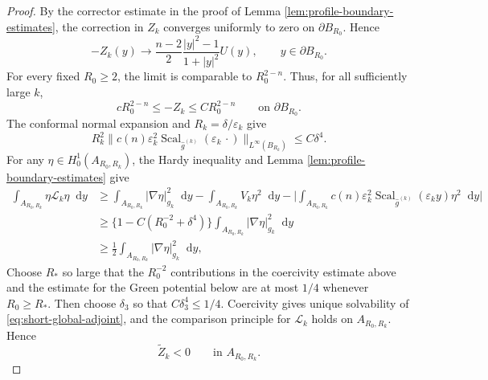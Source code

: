 \documentclass[11pt]{article}
\numberwithin{equation}{section}
\theoremstyle{remark}
\newcommand{\dd}{\mathop{}\!\mathrm{d}}
\begin{document}
\begin{proof}
 By the corrector estimate in the proof of
Lemma  \ref{lem:profile-boundary-estimates}, the correction in $Z_k$
converges uniformly to zero on $\partial B_{R_0}$.  Hence
{
\[
 -Z_k(y)\to
 \frac{n-2}{2}\frac{|y|^2-1}{1+|y|^2}U(y),
 \qquad y\in\partial B_{R_0}.
\]
}
 For every fixed $R_0\ge2$, the limit is comparable to $R_0^{2-n}$.
Thus, for all sufficiently large $k$,
{
\[
 cR_0^{2-n}\le -Z_k\le CR_0^{2-n}
 \qquad\text{on }\partial B_{R_0}.
\]
}
 The conformal normal expansion and $R_k=\delta/\varepsilon_k$ give
{
\[
 R_k^2\Big\|c(n)\varepsilon_k^2
 \operatorname{Scal}_{\widehat g^{(k)}}(\varepsilon_k\,\cdot)
 \Big\|_{L^\infty(B_{R_k})}
 \le C\delta^4.
\]
}
For any $\eta\in H_0^1(A_{R_0,R_k})$, the Hardy inequality and
Lemma  \ref{lem:profile-boundary-estimates} give
{
\[
\begin{aligned}
 \int_{A_{R_0,R_k}}\eta\mathcal L_k\eta\dd y
 &\ge \int_{A_{R_0,R_k}}|\nabla\eta|_{g_k}^2\dd y
 -\int_{A_{R_0,R_k}}V_k\eta^2\dd y
 -\Big|\int_{A_{R_0,R_k}}c(n)\varepsilon_k^2
 \operatorname{Scal}_{\widehat g^{(k)}}(\varepsilon_k y)
 \eta^2\dd y\Big|\\
 &\ge\bigl\{1-C(R_0^{-2}+\delta^4)\bigr\}
 \int_{A_{R_0,R_k}}|\nabla\eta|_{g_k}^2\dd y\\
 &\ge\frac12\int_{A_{R_0,R_k}}|\nabla\eta|_{g_k}^2\dd y,
\end{aligned}
\]
}
Choose $R_*$ so large that the $R_0^{-2}$ contributions
in the coercivity estimate above and the estimate for the Green potential below are at
most $1/4$ whenever $R_0\ge R_*$.  Then choose $\delta_3$ so that
$C\delta_3^4\le1/4$.
{Coercivity gives unique solvability of
\eqref{eq:short-global-adjoint}, and the comparison principle for
\(\mathcal L_k\) holds on \(A_{R_0,R_k}\).}  Hence
{
\[
 \widetilde Z_k<0\qquad\text{in }A_{R_0,R_k}.
\]
}


\end{proof}
\end{document}
